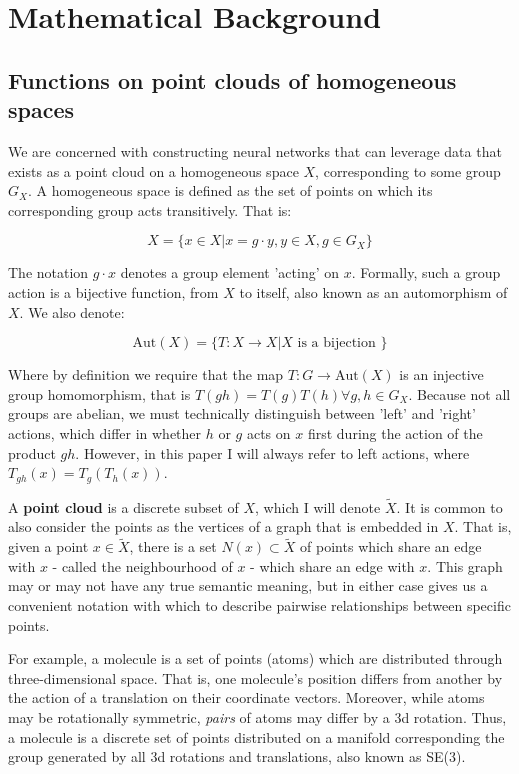 \documentclass[11pt]{article}
\begin{document}
\section{Mathematical Background}
\subsection*{Functions on point clouds of homogeneous spaces}

We are concerned with constructing neural networks that can leverage data that exists as a point cloud on a homogeneous space $X$, corresponding to some group $G_X$. A homogeneous space is defined as the set of points on which its corresponding group acts transitively. That is: 

$$ X = \{x \in X | x = g \cdot y, y \in X, g \in G_X \} $$

The notation $g \cdot x$ denotes a group element 'acting' on $x$. Formally, such a group action is a bijective function, from $X$ to itself, also known as an automorphism of $X$. We also denote:

$$ \text{Aut}(X) = \{T: X \rightarrow X | X \text{ is a bijection } \}$$

Where by definition we require that the map $T: G \rightarrow \text{Aut}(X)$ is an injective group homomorphism, that is $T(gh)=T(g)T(h) \forall g, h \in G_X$. Because not all groups are abelian, we must technically distinguish between 'left' and 'right' actions, which differ in whether $h$ or $g$ acts on $x$ first during the action of the product $gh$. However, in this paper I will always refer to left actions, where $T_{gh} (x) = T_g (T_h (x))$.

A \textbf{point cloud} is a discrete subset of $X$, which I will denote $\tilde{X}$. It is common to also consider the points as the vertices of a graph that is embedded in $X$. That is, given a point $x \in  \tilde{X}$, there is a set $N(x) \subset \tilde{X}$ of points which share an edge with $x$ - called the neighbourhood of $x$ - which share an edge with $x$. This graph may or may not have any true semantic meaning, but in either case gives us a convenient notation with which to describe pairwise relationships between specific points.

For example, a molecule is a set of points (atoms) which are distributed through three-dimensional space. That is, one molecule's position differs from another by the action of a translation on their coordinate vectors. Moreover, while atoms may be rotationally symmetric, \textit{pairs} of atoms may differ by a 3d rotation. Thus, a molecule is a discrete set of points distributed on a manifold corresponding the group generated by all 3d rotations and translations, also known as SE(3).   
\end{document}
